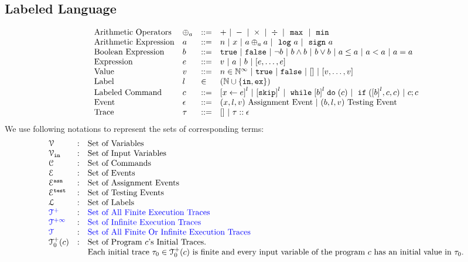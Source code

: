 \subsection{Labeled Language}
\[
\begin{array}{llll}
\mbox{Arithmetic Operators} 
& \oplus_a & ::= & + ~|~ - ~|~ \times 
%
~|~ \div ~|~ \emax ~|~ \emin
\\  
\mbox{Arithmetic Expression} 
& \aexpr & ::= & 
n ~|~ {x} ~|~ \aexpr \oplus_a \aexpr  
 ~|~ \elog \aexpr  ~|~ \esign \aexpr
\\
\mbox{Boolean Expression} & \bexpr & ::= & 
%
\etrue ~|~ \efalse  ~|~ \neg \bexpr
 ~|~ \bexpr \land \bexpr
%
~|~ \bexpr \lor \bexpr
~|~ \aexpr \leq \aexpr 
~|~ \aexpr < \aexpr 
~|~ \aexpr = \aexpr 
\\
\mbox{Expression} & \expr & ::= & v ~|~ \aexpr ~|~ \bexpr ~|~ [\expr, \dots, \expr]
\\  
%
\mbox{Value} 
& v & ::= & { n \in \mathbb{N}^{\infty} ~|~ \etrue ~|~ \efalse ~|~ [] ~|~ [v, \dots, v]} \\
%
\mbox{Label} 
& l & \in & (\mathbb{N} \cup \{\lin, \lex\}) 
\\ 
%
\mbox{Labeled Command} 
& {c} & ::= &  
\clabel{\assign{x}{\expr}}^l 
~|~  \clabel{\eskip}^l
~|~ \ewhile \clabel{\bexpr}^{l} \edo ({c})
~|~ \eif(\clabel{\bexpr}^{l} , {c}, {c}) 
~|~ {c};{c}  
\\ 
\mbox{Event} 
& \event & ::= & 
({x}, l, v) ~ \mbox{Assignment Event} 
~|~(\bexpr, l, v) ~ \mbox{Testing Event}
\\
\mbox{Trace} & \trace
& ::= & [] ~|~ \trace :: \event
\\
\end{array}
\]
We use following notations to represent the sets of corresponding terms:
\[
\begin{array}{lll}
\vardom & : & \mbox{Set of Variables}  
\\ 
%
\inpvar & : & \mbox{Set of Input Variables}  
\\ 
%
\cdom & : & \mbox{Set of Commands} 
\\ 
%
\eventset  & : & \mbox{Set of Events}  
\\
%
\eventset^{\asn}  & : & \mbox{Set of Assignment Events}  
\\
%
\eventset^{\test}  & : & \mbox{Set of Testing Events}  
\\
%
\ldom  & : & \mbox{Set of Labels}  
\\
%
\highlight{\ftdom} & : & \mbox{\highlight{Set of All Finite Execution Traces}}
\\
\highlight{\inftdom} & : & \mbox{\highlight{Set of Infinite  Execution Traces}}
\\
\highlight{\tdom} & : & \mbox{\highlight{Set of All Finite Or Infinite  Execution Traces}}
\\
\ftdom_0(c) & : & \mbox{Set of Program $c$'s Initial Traces.}
\\ & & \mbox{Each initial trace $\trace_0 \in \ftdom_0(c)$ is finite and every input variable of the program $c$ has an initial value in $\trace_0$.}
\end{array}
\]
%
